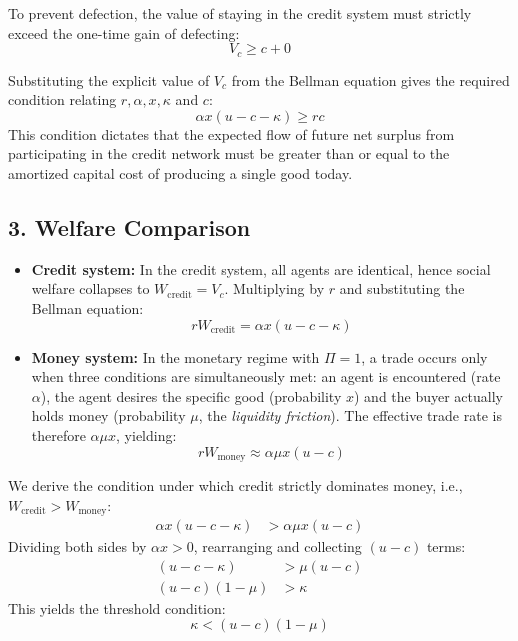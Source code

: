 \documentclass[11pt, a4paper]{article}
\begin{document}
To prevent defection, the value of staying in the credit system must strictly exceed the one-time gain of defecting:
\begin{equation*}
    V_c \ge c + 0
\end{equation*}

Substituting the explicit value of $V_c$ from the Bellman equation gives the required condition relating $r, \alpha, x, \kappa$ and $c$:
\begin{equation}
    \alpha x(u - c - \kappa) \ge rc
\end{equation}
This condition dictates that the expected flow of future net surplus from participating in the credit network must be greater than or equal to the amortized capital cost of producing a single good today.

\subsection*{3. Welfare Comparison}

\begin{itemize}
    \item \textbf{Credit system:} In the credit system, all agents are identical, hence social welfare collapses to $W_{\text{credit}} = V_c$. Multiplying by $r$ and substituting the Bellman equation:
    \begin{equation}
        rW_{\text{credit}} = \alpha x(u - c - \kappa)
    \end{equation}
    \item \textbf{Money system:} In the monetary regime with $\Pi = 1$, a trade occurs only when three conditions are simultaneously met: an agent is encountered (rate $\alpha$), the agent desires the specific good (probability $x$) and the buyer actually holds money (probability $\mu$, the \textit{liquidity friction}). The effective trade rate is therefore $\alpha \mu x$, yielding:
    \begin{equation}
        rW_{\text{money}} \approx \alpha \mu x (u - c)
    \end{equation}
\end{itemize}

We derive the condition under which credit strictly dominates money, i.e., $W_{\text{credit}} > W_{\text{money}}$:
\begin{align*}
    \alpha x(u - c - \kappa) &> \alpha \mu x(u - c)
\end{align*}
Dividing both sides by $\alpha x > 0$, rearranging and collecting $(u - c)$ terms:
\begin{align*}
    (u - c - \kappa) &> \mu(u - c) \\
    (u - c)(1 - \mu) &> \kappa
\end{align*}
This yields the threshold condition:
\begin{equation}
    \boxed{\kappa < (u - c)(1 - \mu)}
\end{equation}
\end{document}
